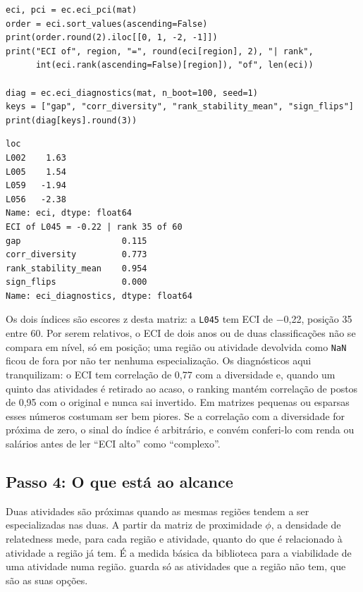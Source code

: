 \begin{lstlisting}
eci, pci = ec.eci_pci(mat)
order = eci.sort_values(ascending=False)
print(order.round(2).iloc[[0, 1, -2, -1]])
print("ECI of", region, "=", round(eci[region], 2), "| rank",
      int(eci.rank(ascending=False)[region]), "of", len(eci))

diag = ec.eci_diagnostics(mat, n_boot=100, seed=1)
keys = ["gap", "corr_diversity", "rank_stability_mean", "sign_flips"]
print(diag[keys].round(3))
\end{lstlisting}
\begin{lstlisting}[language={}, numbers=none, backgroundcolor=\color{white}, frame=leftline, framerule=2pt, rulecolor=\color{noteborder}, xleftmargin=1.5em]
loc
L002    1.63
L005    1.54
L059   -1.94
L056   -2.38
Name: eci, dtype: float64
ECI of L045 = -0.22 | rank 35 of 60
gap                    0.115
corr_diversity         0.773
rank_stability_mean    0.954
sign_flips             0.000
Name: eci_diagnostics, dtype: float64
\end{lstlisting}

Os dois índices são escores z desta matriz: a \texttt{L045} tem ECI
de $-$0{,}22, posição 35
entre 60. Por serem relativos, o ECI de dois anos ou de duas
classificações não se compara em nível, só em posição; uma região ou
atividade devolvida como \texttt{NaN} ficou de fora por não ter nenhuma
especialização. Os diagnósticos aqui tranquilizam: o ECI tem correlação
de 0{,}77 com a diversidade e, quando um quinto das
atividades é retirado ao acaso, o ranking mantém correlação de postos de
0{,}95 com o original e nunca sai invertido. Em
matrizes pequenas ou esparsas esses números costumam ser bem piores. Se
a correlação com a diversidade for próxima de zero, o sinal do índice é
arbitrário, e convém conferi-lo com renda ou salários antes de ler ``ECI
alto'' como ``complexo''.

\subsection{Passo 4: O que está ao alcance}

Duas atividades são próximas quando as mesmas regiões tendem a ser
especializadas nas duas. A partir da matriz de proximidade $\phi$, a
densidade de relatedness mede, para cada região e atividade, quanto do
que é relacionado à atividade a região já tem. É a medida básica da
biblioteca para a viabilidade de uma atividade numa região.
 guarda só as atividades que a
região não tem, que são as suas opções.

